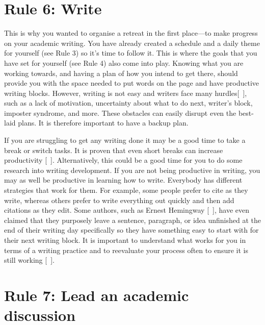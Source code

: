 \documentclass[10pt,letterpaper]{article}
\begin{document}
\section*{Rule 6: Write}

This is why you wanted to organise a retreat in the first place---to make progress on your academic writing. You have already created a schedule and a daily theme for yourself (see Rule 3) so it’s time to follow it. This is where the goals that you have set for yourself (see Rule 4) also come into play. Knowing what you are working towards, and having a plan of how you intend to get there, should provide you with the space needed to put words on the page and have productive writing blocks. However, writing is not easy and writers face many hurdles[~\cite{grogan2021}], such as a lack of motivation, uncertainty about what to do next, writer’s block, imposter syndrome, and more. These obstacles can easily disrupt even the best-laid plans. It is therefore important to have a backup plan.

If you are struggling to get any writing done it may be a good time to take a break or switch tasks. It is proven that even short breaks can increase productivity [~\cite{lyubykh, carter2020}]. Alternatively, this could be a good time for you to do some research into writing development. If you are not being productive in writing, you may as well be productive in learning how to write. Everybody has different strategies that work for them. For example, some people prefer to cite as they write, whereas others prefer to write everything out quickly and then add citations as they edit. Some authors, such as Ernest Hemingway [~\cite{hemingway}], have even claimed that they purposely leave a sentence, paragraph, or idea unfinished at the end of their writing day specifically so they have something easy to start with for their next writing block. It is important to understand what works for you in terms of a writing practice and to reevaluate your process often to ensure it is still working [~\cite{peterson2018, grogan2021}].

\section*{Rule 7: Lead an academic discussion}
\end{document}
